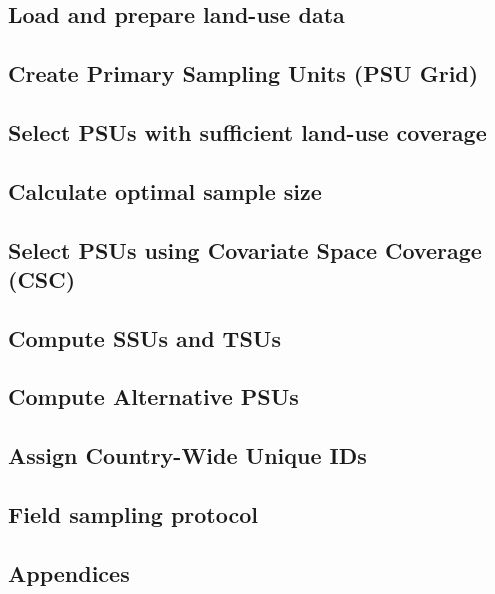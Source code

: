\documentclass[
  10pt,
  b5paper,
  oneside]{book}
\begin{document}
\subsection{Load and prepare land-use data}\label{sec-landuse}

\subsection{Create Primary Sampling Units (PSU Grid)}\label{create-psu-grid}

\subsection{Select PSUs with sufficient land-use coverage}\label{select-psus}

\subsection{Calculate optimal sample size}\label{sec-optimal-sample-size}

\subsection{Select PSUs using Covariate Space Coverage (CSC)}\label{sec-select-psus-csc}

\subsection{Compute SSUs and TSUs}\label{compute-ssu-tsu}

\subsection{Compute Alternative PSUs}\label{alternative-psus}

\subsection{Assign Country-Wide Unique IDs}\label{assign-unique-ids}

\subsection{Field sampling protocol}\label{field-protocol}

\subsection*{Appendices}\label{appendices}
\end{document}
